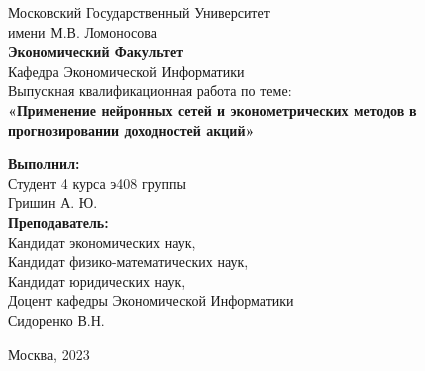 \begin{center}
	\large{Московский Государственный Университет\\имени М.В. Ломоносова}\\
	\hfill \break
	\normalsize{\textbf{Экономический Факультет}}\\
	\hfill \break
	\normalsize{Кафедра Экономической Информатики}\\
	\hfill \break
	\hfill \break
	\hfill \break
	\hfill \break
	\large{Выпускная квалификационная работа по теме:}\\
	\hfill \break
	\large{\textbf{«Применение нейронных сетей и эконометрических методов} \textbf{в прогнозировании доходностей акций»}}\\
	\hfill \break
\end{center}
\hfill \break
\hfill \break
\hfill \break
\begin{flushright}
	\textbf{Выполнил:}\\
	Студент 4 курса э408 группы\\
	\hfill \break
	Гришин А. Ю.\\
	\hfill \break
	\textbf{Преподаватель:}\\
	Кандидат экономических наук,\\
	Кандидат физико-математических наук,\\
	Кандидат юридических наук,\\
	Доцент кафедры Экономической Информатики\\
	\hfill \break
	Сидоренко В.Н.
\end{flushright}
\hfill \break
\hfill \break
\hfill \break
\hfill \break
\begin{center} Москва, 2023 \end{center}
\thispagestyle{empty} %


